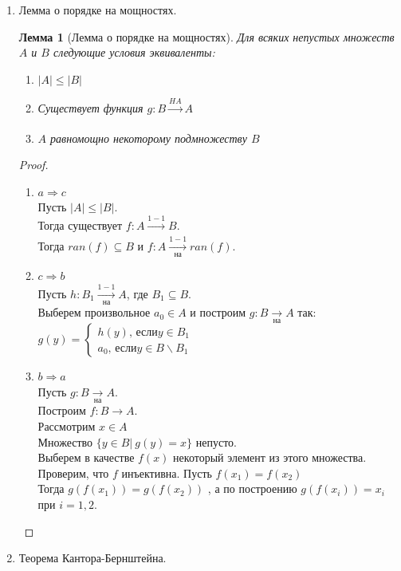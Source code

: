 \documentclass[a4paper]{article}
\newtheorem*{lemma*}{Лемма}
\theoremstyle{definition}
\begin{document}
\begin{enumerate}
 \item Лемма о порядке на мощностях.
       \begin{lemma*}[Лемма о порядке на мощностях]
        Для всяких непустых множеств $A$ и $B$ следующие условия эквиваленты:
        \begin{enumerate}
         \item $\left | A \right | \leq \left | B \right |$
         \item Существует функция $g : B\xrightarrow[]{HA}A$
         \item $A$ равномощно некоторому подмножеству $B$
        \end{enumerate}
       \end{lemma*}
       \begin{proof}
        \mbox{}\\
        \begin{enumerate}
         \item $a \Rightarrow c$ \\
               Пусть $\left | A \right | \leq \left | B \right |$.\\
               Тогда существует $f : A \xrightarrow[]{1-1} B$. \\
               Тогда $ran(f) \subseteq B$ и $f : A\xrightarrow[\textit{на}]{1-1}ran(f)$.\\
         \item $c \Rightarrow b$ \\
               Пусть $h : B_{1}\xrightarrow[\text{на}]{1-1}A$, где $B_{1}\subseteq B$. \\
               Выберем произвольное $a_{0} \in A$ и построим $g : B\xrightarrow[\text{на}]{}A$ так:
               $g(y) = \left\{\begin{matrix}
                 h(y)\text{, если} y \in B_{1} \\
                 a_{0}\text{, если}y \in B\backslash B_{1}
                \end{matrix}\right.$
         \item $b \Rightarrow a$ \\
               Пусть $g : B\xrightarrow[\text{на}]{ }A$.\\
               Построим $f : B\rightarrow A$.\\
               Рассмотрим $x\in A$\\
               Множество $\{y\in B |\ g(y) = x\}$ непусто.\\
               Выберем в качестве $f(x)$ некоторый элемент из этого множества. Проверим, что $f$ инъективна. Пусть $f(x_{1}) = f(x_{2})$\\
               Тогда $g(f(x_{1})) = g(f(x_{2}))$ , а по построению $g(f(x_{i})) = x_{i}$ при $i = 1,2.$
        \end{enumerate}
       \end{proof}
 \item Теорема Кантора-Бернштейна.


\end{enumerate}
\end{document}

